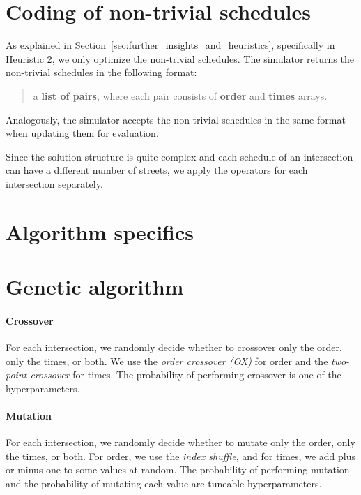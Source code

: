 \section{Coding of non-trivial schedules} \label{sec:coding_of_a_solution}

As explained in Section~\ref{sec:further_insights_and_heuristics}, specifically in \hyperref[para:heuristic_2]{Heuristic 2}, we only optimize the non-trivial schedules. The simulator returns the non-trivial schedules in the following format:
\begin{quote}
    a \textbf{list of pairs}, where each pair consists of \textbf{order} and \textbf{times} arrays.
\end{quote}
Analogously, the simulator accepts the non-trivial schedules in the same format when updating them for evaluation.

Since the solution structure is quite complex and each schedule of an intersection can have a different number of streets, we apply the operators for each intersection separately.

\section{Algorithm specifics }


\section{Genetic algorithm}

\paragraph{Crossover}

For each intersection, we randomly decide whether to crossover only the order, only the times, or both. We use the \textit{order crossover (OX)} for order and the \textit{two-point crossover} for times. The probability of performing crossover is one of the hyperparameters.

\paragraph{Mutation}

For each intersection, we randomly decide whether to mutate only the order, only the times, or both. For order, we use the \textit{index shuffle}, and for times, we add plus or minus one to some values at random. The probability of performing mutation and the probability of mutating each value are tuneable hyperparameters.

